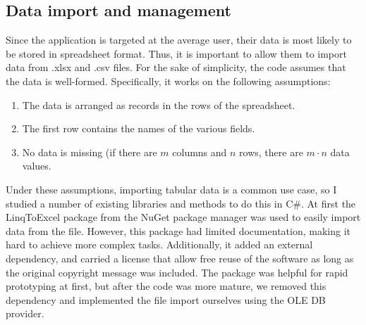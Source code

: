 	
	\subsection{Data import and management}
		Since the application is targeted at the average user, their data is most likely to be stored in spreadsheet format. Thus, it is important to allow them to import data from .xlsx and .csv files. 
		For the sake of simplicity, the code assumes that the data is well-formed. Specifically, it works on the following assumptions:
		\begin{enumerate}
		\item The data is arranged as records in the rows of the spreadsheet.
		\item The first row contains the names of the various fields.
		\item No data is missing (if there are $m$ columns and $n$ rows, there are $m \cdot n$ data values.
		\end{enumerate}
		
		Under these assumptions, importing tabular data is a common use case, so I studied a number of existing libraries and methods to do this in C\#. At first the LinqToExcel package from the NuGet package manager was used to easily import data from the file. However, this package had limited documentation, making it hard to achieve more complex tasks. Additionally, it added an external dependency, and carried a license that allow free reuse of the software as long as the original copyright message was included. The package was helpful for rapid prototyping at first, but after the code was more mature, we removed this dependency and implemented the file import ourselves using the OLE DB provider.
	

